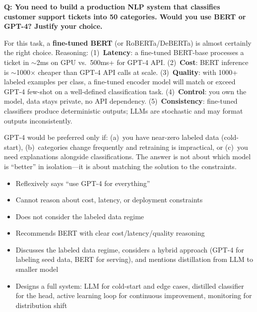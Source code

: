 \bigskip

\begin{interviewq}
\textbf{Q: You need to build a production NLP system that classifies customer
support tickets into 50 categories. Would you use BERT or GPT-4? Justify your
choice.}

 \quad {} \quad \badgefreq{\freqmed}

\stronganswer
For this task, a \textbf{fine-tuned BERT} (or RoBERTa/DeBERTa) is almost
certainly the right choice.  Reasoning: (1)~\textbf{Latency}: a fine-tuned
BERT-base processes a ticket in $\sim$2ms on GPU vs.\ 500ms+ for GPT-4 API.
(2)~\textbf{Cost}: BERT inference is $\sim$1000$\times$ cheaper than GPT-4 API
calls at scale.  (3)~\textbf{Quality}: with 1000+ labeled examples per class,
a fine-tuned encoder model will match or exceed GPT-4 few-shot on a well-defined
classification task.  (4)~\textbf{Control}: you own the model, data stays
private, no API dependency.  (5)~\textbf{Consistency}: fine-tuned classifiers
produce deterministic outputs; LLMs are stochastic and may format outputs
inconsistently.

GPT-4 would be preferred only if: (a)~you have near-zero labeled data
(cold-start), (b)~categories change frequently and retraining is impractical,
or (c)~you need explanations alongside classifications.  The answer is not about
which model is ``better'' in isolation---it is about matching the solution to
the constraints.

\redflags
\begin{itemize}
    \item Reflexively says ``use GPT-4 for everything''
    \item Cannot reason about cost, latency, or deployment constraints
    \item Does not consider the labeled data regime
\end{itemize}


\goodgreat
\begin{itemize}
    \item {} Recommends BERT with clear cost/latency/quality reasoning
    \item {} Discusses the labeled data regime, considers a hybrid
          approach (GPT-4 for labeling seed data, BERT for serving), and mentions
          distillation from LLM to smaller model
    \item {} Designs a full system: LLM for cold-start and edge
          cases, distilled classifier for the head, active learning loop for
          continuous improvement, monitoring for distribution shift
\end{itemize}

\end{interviewq}


